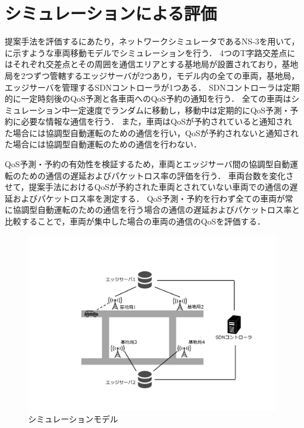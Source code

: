 \documentclass[a4paper,10pt,twocolumn,uplatex]{jsarticle}
\begin{document}
\section{シミュレーションによる評価}
\label{simulation}
提案手法を評価するにあたり，ネットワークシミュレータであるNS-3を用いて，に示すような車両移動モデルでシミュレーションを行う．
4つのT字路交差点にはそれぞれ交差点とその周囲を通信エリアとする基地局が設置されており，基地局を2つずつ管轄するエッジサーバが2つあり，モデル内の全ての車両，基地局，エッジサーバを管理するSDNコントローラが1つある．
SDNコントローラは定期的に一定時刻後のQoS予測と各車両へのQoS予約の通知を行う．
全ての車両はシミュレーション中一定速度でランダムに移動し，移動中は定期的にQoS予測・予約に必要な情報な通信を行う．
また，車両はQoSが予約されていると通知された場合には協調型自動運転のための通信を行い，QoSが予約されないと通知された場合には協調型自動運転のための通信を行わない．\par
QoS予測・予約の有効性を検証するため，車両とエッジサーバ間の協調型自動運転のための通信の遅延およびパケットロス率の評価を行う．
車両台数を変化させて，提案手法におけるQoSが予約された車両とされていない車両での通信の遅延およびパケットロス率を測定する．
QoS予測・予約を行わず全ての車両が常に協調型自動運転のための通信を行う場合の通信の遅延およびパケットロス率と比較することで，車両が集中した場合の車両の通信のQoSを評価する．

\begin{figure}[t]
	\begin{centering}
    \includegraphics[width=\linewidth]{img/202306_simulationModel.pdf}
    \caption{シミュレーションモデル}
    \label{fig:model}
    \end{centering}
\end{figure}
\end{document}

